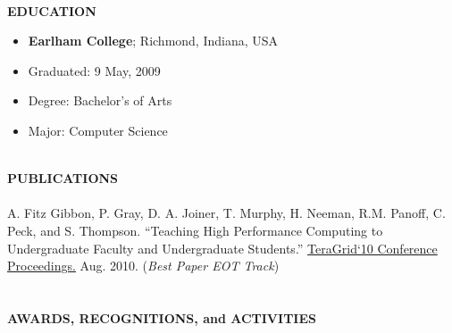\documentclass[10pt]{article}
\begin{document}
\pagebreak

~\\
\textbf{EDUCATION}~\\
\vspace{-4mm}
\begin{itemize}
  \addtolength{\itemsep}{-2mm}
	\item[] \indent \textbf{Earlham College}; Richmond, Indiana, USA
	\item[] \indent Graduated: 9 May, 2009
	\item[] \indent Degree: Bachelor's of Arts
	\item[] \indent Major: Computer Science
\end{itemize}
~\\
\textbf{PUBLICATIONS}~\\
	~\\
	\indent A. Fitz Gibbon, P. Gray, D. A. Joiner, T. Murphy, H. Neeman, R.M. Panoff, C. Peck, and S. Thompson. ``Teaching High Performance Computing to Undergraduate Faculty and Undergraduate Students.'' \underline{TeraGrid`10 Conference Proceedings.} Aug. 2010. (\emph{Best Paper EOT Track})
~\\
~\\
~\\
\textbf{AWARDS, RECOGNITIONS, and ACTIVITIES}~\\
\vspace{-4mm}
\end{document}
